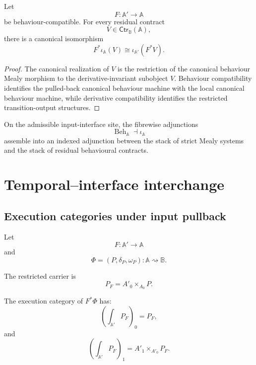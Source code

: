 \begin{proposition}
\label{prop:restriction-canonical-realizations}
Let
\[
    F:\mathbb A'\to\mathbb A
\]
be behaviour-compatible. For every residual contract
\[
    V\in\mathsf{Ctr}_{\mathbb B}(\mathbb A),
\]
there is a canonical isomorphism
\[
    F^\ast\iota_{\mathbb A}(V)
    \cong
    \iota_{\mathbb A'}(F^\ast V).
\]
\end{proposition}

\begin{proof}
The canonical realization of \(V\) is the restriction of the canonical
behaviour Mealy morphism to the derivative-invariant subobject \(V\).
Behaviour compatibility identifies the pulled-back canonical behaviour
machine with the local canonical behaviour machine, while derivative
compatibility identifies the restricted transition-output structures.
\end{proof}

\begin{corollary}
\label{cor:indexed-abstraction-realization}
On the admissible input-interface site, the fibrewise adjunctions
\[
    \operatorname{Beh}_{\mathbb A}
    \dashv
    \iota_{\mathbb A}
\]
assemble into an indexed adjunction between the stack of strict Mealy systems
and the stack of residual behavioural contracts.
\end{corollary}

\section{Temporal--interface interchange}
\label{sec:temporal-interface-interchange}

\subsection{Execution categories under input pullback}
\label{subsec:execution-categories-input-pullback}

Let
\[
    F:\mathbb A'\to\mathbb A
\]
and
\[
    \Phi=(P,\delta_P,\omega_P):
    \mathbb A\rightsquigarrow\mathbb B.
\]

The restricted carrier is
\[
    P_F=A'_0\times_{A_0}P.
\]

The execution category of \(F^\ast\Phi\) has:
\[
    \left(
    \int_{\mathbb A'}P_F
    \right)_0
    =
    P_F,
\]
and
\[
    \left(
    \int_{\mathbb A'}P_F
    \right)_1
    =
    A'_1\times_{A'_0}P_F.
\]

